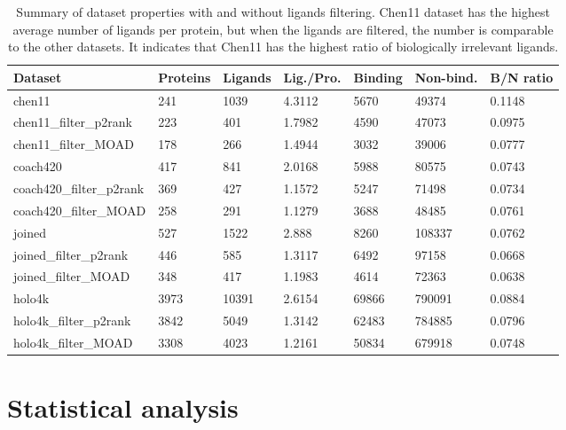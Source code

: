 \begin{table}[]
\footnotesize
\begin{tabular}{@{}lllllll@{}}
\toprule
Dataset                  & Proteins & Ligands & Lig./Pro. & Binding & Non-bind. & B/N ratio \\ \midrule
chen11                   & 241      & 1039    & 4.3112        & 5670         & 49374            & 0.1148    \\
chen11\_filter\_p2rank   & 223      & 401     & 1.7982        & 4590         & 47073            & 0.0975    \\
chen11\_filter\_MOAD     & 178      & 266     & 1.4944        & 3032         & 39006            & 0.0777    \\
coach420                 & 417      & 841     & 2.0168        & 5988         & 80575            & 0.0743    \\
coach420\_filter\_p2rank & 369      & 427     & 1.1572        & 5247         & 71498            & 0.0734    \\
coach420\_filter\_MOAD   & 258      & 291     & 1.1279        & 3688         & 48485            & 0.0761    \\
joined                   & 527      & 1522    & 2.888         & 8260         & 108337           & 0.0762    \\
joined\_filter\_p2rank   & 446      & 585     & 1.3117        & 6492         & 97158            & 0.0668    \\
joined\_filter\_MOAD     & 348      & 417     & 1.1983        & 4614         & 72363            & 0.0638    \\
holo4k                   & 3973     & 10391   & 2.6154        & 69866        & 790091           & 0.0884    \\
holo4k\_filter\_p2rank   & 3842     & 5049    & 1.3142        & 62483        & 784885           & 0.0796    \\
holo4k\_filter\_MOAD     & 3308     & 4023    & 1.2161        & 50834        & 679918           & 0.0748    \\ \bottomrule
\end{tabular}
\caption{Summary of dataset properties with and without ligands filtering. Chen11 dataset has the highest average number of ligands per protein, but when the ligands are filtered, the number is comparable to the other datasets. It indicates that Chen11 has the highest ratio of biologically irrelevant ligands.}
\label{tab:datasets}
\end{table}

\section{Statistical analysis}

